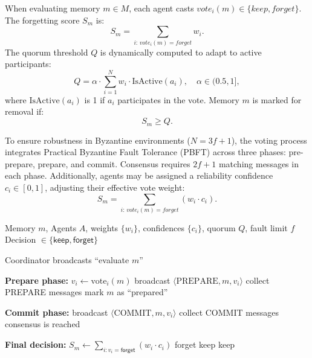 \documentclass[conference]{IEEEtran}
\begin{document}
When evaluating memory \(m\in M\), each agent casts \(vote_i(m)\in\{\textit{keep},\textit{forget}\}\). The forgetting score \(S_m\) is:
\[
S_m = \sum_{i:\,vote_i(m)=\textit{forget}} w_i.
\]
The quorum threshold \(Q\) is dynamically computed to adapt to active participants:
\[
Q = \alpha\cdot\sum_{i=1}^N w_i \cdot \mathrm{IsActive}(a_i),\quad \alpha\in(0.5,1],
\]
where \(\mathrm{IsActive}(a_i)\) is 1 if \(a_i\) participates in the vote. Memory \(m\) is marked for removal if:
\[
S_m \ge Q.
\]

To ensure robustness in Byzantine environments (\(N = 3f + 1\)), the voting process integrates Practical Byzantine Fault Tolerance (PBFT) across three phases: pre-prepare, prepare, and commit. Consensus requires \(2f+1\) matching messages in each phase. Additionally, agents may be assigned a reliability confidence \(c_i\in[0,1]\), adjusting their effective vote weight:
\[
S_m = \sum_{i:\,vote_i(m)=\textit{forget}} (w_i \cdot c_i).
\]

\begin{algorithm}[htbp]
\caption{PBFT Voting Process for Memory Pruning}
\label{alg:pbft_voting}
\begin{algorithmic}[1]
\Require Memory $m$, Agents $A$, weights $\{w_i\}$, confidences $\{c_i\}$, quorum $Q$, fault limit $f$
\Ensure Decision $\in\{\textsf{keep},\textsf{forget}\}$

\State Coordinator broadcasts ``evaluate $m$''

\Statex \textbf{Prepare phase:}
  \State $v_i \gets \text{vote}_i(m)$  
  \State broadcast $\langle \text{PREPARE}, m, v_i\rangle$
\EndFor
{}
  \State collect PREPARE messages
    \State mark $m$ as “prepared”
  \EndIf
\EndFor

\Statex \textbf{Commit phase:}
  \State broadcast $\langle \text{COMMIT}, m, v_i\rangle$
\EndFor
{}
  \State collect COMMIT messages
    \State consensus is reached
  \EndIf
\EndFor

\Statex \textbf{Final decision:}
  \State $S_m \gets \sum_{i: v_i = \textsf{forget}}(w_i \cdot c_i)$
    \State \Return \textsf{forget}
  \Else
    \State \Return \textsf{keep}
  \EndIf
\Else
  \State \Return \textsf{keep}
\EndIf
\end{algorithmic}
\end{algorithm}
\end{document}
